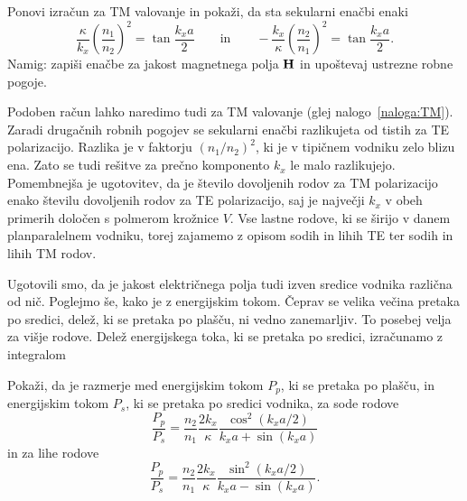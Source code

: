 \begin{definition}
\label{naloga:TM}
Ponovi izračun za TM valovanje
in pokaži, da sta sekularni enačbi enaki 
\begin{equation}
\frac{\kappa}{k_x} \left(\frac{n_1}{n_2}\right)^2= 
\tan \frac{k_x a}{2} \qquad \mathrm{in} \qquad -\frac{k_x}{\kappa} \left(\frac{n_2}{n_1}\right)^2= 
\tan \frac{k_x a}{2}.
\end{equation}
Namig: zapiši enačbe za jakost magnetnega polja ${\bf H}$ in upoštevaj ustrezne robne pogoje.
\end{definition}

Podoben račun lahko naredimo tudi za TM valovanje (glej nalogo~\ref{naloga:TM}). Zaradi drugačnih
robnih pogojev se sekularni enačbi razlikujeta od tistih za TE polarizacijo. Razlika je v
faktorju $(n_1/n_2)^2$, ki je v tipičnem vodniku zelo blizu ena. Zato se tudi rešitve 
za prečno komponento $k_x$ le malo razlikujejo. Pomembnejša je ugotovitev, da je število
dovoljenih rodov za TM polarizacijo enako številu dovoljenih rodov za TE polarizacijo, 
saj je največji $k_x$ v obeh primerih določen s polmerom krožnice $V$. 
Vse lastne rodove, ki se širijo v danem planparalelnem vodniku, torej zajamemo z opisom sodih
in lihih TE ter sodih in lihih TM rodov.

Ugotovili smo, da je jakost električnega polja tudi izven sredice vodnika različna od nič. 
Poglejmo še, kako je z energijskim tokom. Čeprav se velika večina pretaka po sredici, 
delež, ki se pretaka po plašču, ni vedno zanemarljiv. To posebej velja za višje rodove. 
Delež energijskega toka, ki se pretaka po sredici, izračunamo
z integralom
\begin{definition}
Pokaži, da je razmerje med energijskim tokom $P_p$, ki se pretaka po plašču, in energijskim tokom $P_s$, 
ki se pretaka po sredici vodnika, za sode rodove
\begin{equation}
\frac{P_p}{P_s}= \frac{n_2}{n_1}\frac{2 k_x}{\kappa} \frac{\cos^2(k_x a/2)}{k_xa + \sin(k_xa)}
\end{equation}
in za lihe rodove
\begin{equation}
\frac{P_p}{P_s}= \frac{n_2}{n_1}\frac{2 k_x}{\kappa} \frac{\sin^2(k_x a/2)}{k_xa - \sin(k_xa)}.
\end{equation}
\end{definition}

